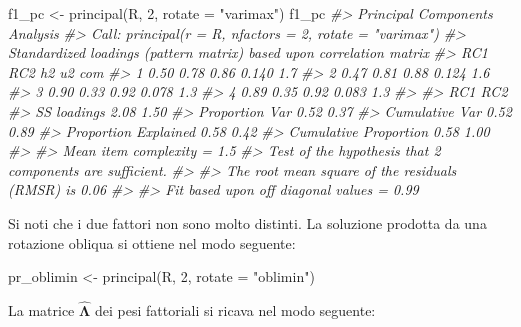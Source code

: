 \documentclass[
  11pt,
]{krantz}
\makeatletter
\newenvironment{Shaded}{\begin{snugshade}}{\end{snugshade}}
\newcommand{\AttributeTok}[1]{\textcolor[rgb]{0.61,0.61,0.61}{#1}}
\newcommand{\CommentTok}[1]{\textcolor[rgb]{0.37,0.37,0.37}{\textit{#1}}}
\newcommand{\DecValTok}[1]{\textcolor[rgb]{0.06,0.06,0.06}{#1}}
\newcommand{\FunctionTok}[1]{\textcolor[rgb]{0,0,0}{#1}}
\newcommand{\NormalTok}[1]{#1}
\newcommand{\OtherTok}[1]{\textcolor[rgb]{0.37,0.37,0.37}{#1}}
\newcommand{\SpecialCharTok}[1]{\textcolor[rgb]{0,0,0}{#1}}
\newcommand{\StringTok}[1]{\textcolor[rgb]{0.5,0.5,0.5}{#1}}
\newenvironment{kframe}{%
\medskip{}
\setlength{\fboxsep}{.8em}
 \def\at@end@of@kframe{}%
 \ifinner\ifhmode%
  \def\at@end@of@kframe{\end{minipage}}%
  \begin{minipage}{\columnwidth}%
 \fi\fi%
 \def\FrameCommand##1{\hskip\@totalleftmargin \hskip-\fboxsep
 \colorbox{shadecolor}{##1}\hskip-\fboxsep
     \hskip-\linewidth \hskip-\@totalleftmargin \hskip\columnwidth}%
 \MakeFramed {\advance\hsize-\width
   \@totalleftmargin\z@ \linewidth\hsize
   \@setminipage}}%
 {\par\unskip\endMakeFramed%
 \at@end@of@kframe}
\renewenvironment{Shaded}{\begin{kframe}}{\end{kframe}}
\theoremstyle{definition}
\theoremstyle{definition}
\theoremstyle{definition}
\theoremstyle{definition}
\theoremstyle{remark}
\makeatother
\begin{document}
\begin{Shaded}
\begin{Highlighting}[]
\NormalTok{f1\_pc }\OtherTok{\textless{}{-}} \FunctionTok{principal}\NormalTok{(R, }\DecValTok{2}\NormalTok{, }\AttributeTok{rotate =} \StringTok{"varimax"}\NormalTok{)}
\NormalTok{f1\_pc}
\CommentTok{\#\textgreater{} Principal Components Analysis}
\CommentTok{\#\textgreater{} Call: principal(r = R, nfactors = 2, rotate = "varimax")}
\CommentTok{\#\textgreater{} Standardized loadings (pattern matrix) based upon correlation matrix}
\CommentTok{\#\textgreater{}    RC1  RC2   h2    u2 com}
\CommentTok{\#\textgreater{} 1 0.50 0.78 0.86 0.140 1.7}
\CommentTok{\#\textgreater{} 2 0.47 0.81 0.88 0.124 1.6}
\CommentTok{\#\textgreater{} 3 0.90 0.33 0.92 0.078 1.3}
\CommentTok{\#\textgreater{} 4 0.89 0.35 0.92 0.083 1.3}
\CommentTok{\#\textgreater{} }
\CommentTok{\#\textgreater{}                        RC1  RC2}
\CommentTok{\#\textgreater{} SS loadings           2.08 1.50}
\CommentTok{\#\textgreater{} Proportion Var        0.52 0.37}
\CommentTok{\#\textgreater{} Cumulative Var        0.52 0.89}
\CommentTok{\#\textgreater{} Proportion Explained  0.58 0.42}
\CommentTok{\#\textgreater{} Cumulative Proportion 0.58 1.00}
\CommentTok{\#\textgreater{} }
\CommentTok{\#\textgreater{} Mean item complexity =  1.5}
\CommentTok{\#\textgreater{} Test of the hypothesis that 2 components are sufficient.}
\CommentTok{\#\textgreater{} }
\CommentTok{\#\textgreater{} The root mean square of the residuals (RMSR) is  0.06 }
\CommentTok{\#\textgreater{} }
\CommentTok{\#\textgreater{} Fit based upon off diagonal values = 0.99}
\end{Highlighting}
\end{Shaded}

Si noti che i due fattori non sono molto distinti. La soluzione prodotta da una rotazione obliqua si ottiene nel modo seguente:

\begin{Shaded}
\begin{Highlighting}[]
\NormalTok{pr\_oblimin }\OtherTok{\textless{}{-}} \FunctionTok{principal}\NormalTok{(R, }\DecValTok{2}\NormalTok{, }\AttributeTok{rotate =} \StringTok{"oblimin"}\NormalTok{)}
\end{Highlighting}
\end{Shaded}

La matrice \(\hat{\boldsymbol{\Lambda}}\) dei pesi fattoriali si ricava nel modo seguente:

\begin{Shaded}
\end{Shaded}
\end{document}
